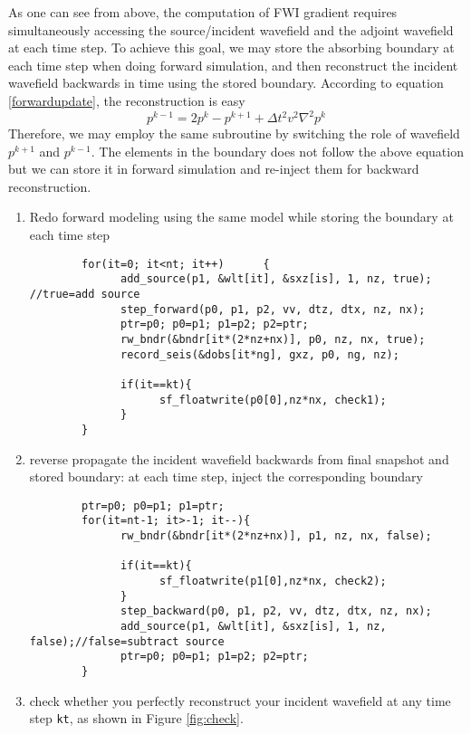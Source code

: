 As one can see from above, the computation of FWI gradient requires simultaneously accessing the source/incident wavefield and the adjoint wavefield at each time step. To achieve this goal, we may store the absorbing boundary at each time step when doing forward simulation, and then reconstruct the incident wavefield backwards in time using the stored boundary. According to equation \eqref{forwardupdate}, the reconstruction is easy 
\begin{equation}
 p^{k-1}=2p^{k}-p^{k+1}+\Delta t^2 v^2 \nabla^2 p^k  
\end{equation}
Therefore, we may employ the same subroutine by switching the role of wavefield $p^{k+1}$ and $p^{k-1}$. The elements in the boundary does not follow the above equation but we can store it in forward simulation and re-inject them for backward reconstruction. 
\begin{enumerate}
 \item Redo forward modeling using the same model while storing the boundary at each time step
 \begin{verbatim}  
		for(it=0; it<nt; it++)		{
			  add_source(p1, &wlt[it], &sxz[is], 1, nz, true); //true=add source	
			  step_forward(p0, p1, p2, vv, dtz, dtx, nz, nx);
			  ptr=p0; p0=p1; p1=p2; p2=ptr;
			  rw_bndr(&bndr[it*(2*nz+nx)], p0, nz, nx, true); 
			  record_seis(&dobs[it*ng], gxz, p0, ng, nz);
			  
			  if(it==kt){
				    sf_floatwrite(p0[0],nz*nx, check1);
			  }
		}
 \end{verbatim}

 
 \item reverse propagate the incident wavefield backwards from final snapshot and stored boundary: at each time step, inject the corresponding boundary
 \begin{verbatim}  
		ptr=p0; p0=p1; p1=ptr;
		for(it=nt-1; it>-1; it--){
			  rw_bndr(&bndr[it*(2*nz+nx)], p1, nz, nx, false);

			  if(it==kt){
				    sf_floatwrite(p1[0],nz*nx, check2);
			  }
			  step_backward(p0, p1, p2, vv, dtz, dtx, nz, nx);
			  add_source(p1, &wlt[it], &sxz[is], 1, nz, false);//false=subtract source
			  ptr=p0; p0=p1; p1=p2; p2=ptr;
		}
 \end{verbatim}
 
 \item check whether you perfectly reconstruct your incident wavefield at any time step \texttt{kt}, as shown in Figure \ref{fig:check}.
 
\end{enumerate}


